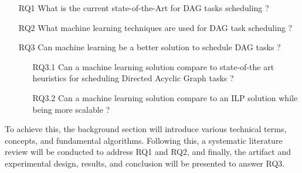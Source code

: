 \begin{itemize}
    \item [RQ1] What is the current state-of-the-Art for DAG tasks scheduling ?        
    \item [RQ2] What machine learning  techniques are used for DAG task scheduling ?
    \item [RQ3]  Can machine learning be a better solution to schedule DAG tasks ?
            \begin{itemize}
                \item [RQ3.1] Can a machine learning solution compare to state-of-the art heuristics for scheduling Directed Acyclic Graph tasks ?
                \item [RQ3.2] Can a machine learning solution compare to an ILP solution while being more scalable ?
            \end{itemize}    
\end{itemize}

To achieve this, the background section will introduce various 
technical terms, concepts, and fundamental algorithms. 
Following this, a systematic literature review will be conducted to address RQ1 and RQ2, 
and finally, the artifact and experimental design, results, and conclusion will 
be presented to answer RQ3.




